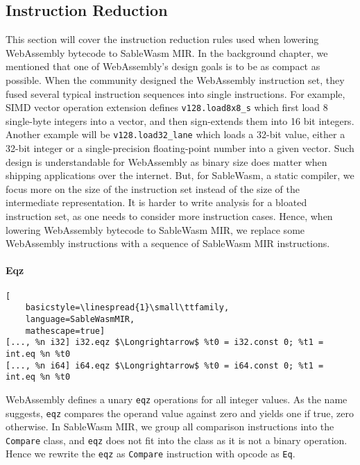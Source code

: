 \subsection{Instruction Reduction}

This section will cover the instruction reduction rules used when lowering
WebAssembly bytecode to SableWasm MIR. In the background chapter, we mentioned
that one of WebAssembly's design goals is to be as compact as possible. When the
community designed the WebAssembly instruction set, they fused several typical
instruction sequences into single instructions. For example, SIMD vector
operation extension defines \texttt{v128.load8x8\_s} which first load 8
single-byte integers into a vector, and then sign-extends them into 16 bit
integers. Another example will be \texttt{v128.load32\_lane} which loads a
32-bit value, either a 32-bit integer or a single-precision floating-point
number into a given vector. Such design is understandable for WebAssembly as
binary size does matter when shipping applications over the internet. But, for
SableWasm, a static compiler, we focus more on the size of the instruction set
instead of the size of the intermediate representation. It is harder to write
analysis for a bloated instruction set, as one needs to consider more
instruction cases. Hence, when lowering WebAssembly bytecode to SableWasm MIR,
we replace some WebAssembly instructions with a sequence of SableWasm MIR
instructions.

\paragraph{Eqz} \quad
\begin{lstlisting}[
    basicstyle=\linespread{1}\small\ttfamily, 
    language=SableWasmMIR, 
    mathescape=true]
[..., %n i32] i32.eqz $\Longrightarrow$ %t0 = i32.const 0; %t1 = int.eq %n %t0
[..., %n i64] i64.eqz $\Longrightarrow$ %t0 = i64.const 0; %t1 = int.eq %n %t0
\end{lstlisting}
WebAssembly defines a unary \texttt{eqz} operations for all integer values. As
the name suggests, \texttt{eqz} compares the operand value against zero and
yields one if true, zero otherwise. In SableWasm MIR, we group all comparison
instructions into the \texttt{Compare} class, and \texttt{eqz} does not fit into
the class as it is not a binary operation. Hence we rewrite the \texttt{eqz} as
\texttt{Compare} instruction with opcode as \texttt{Eq}.

